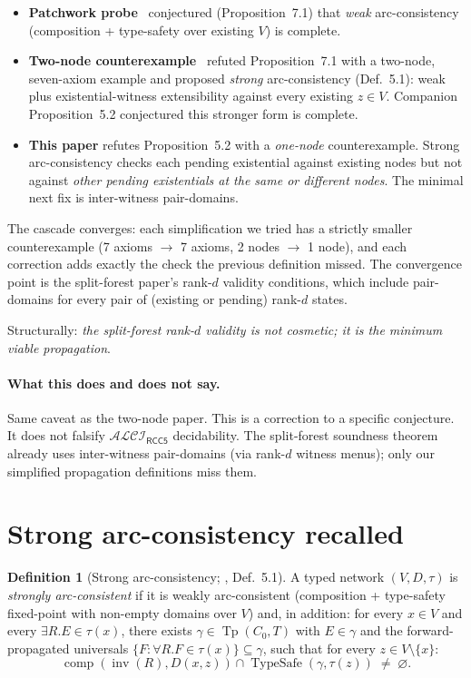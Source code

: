 \documentclass[11pt]{article}
\theoremstyle{definition}
\newtheorem{definition}[theorem]{Definition}
\theoremstyle{remark}
\newcommand{\Tp}{\operatorname{Tp}}
\newcommand{\comp}{\operatorname{comp}}
\newcommand{\inv}{\operatorname{inv}}
\newcommand{\TypeSafe}{\operatorname{TypeSafe}}
\newcommand{\ALCIRCC}[1]{\mathcal{ALCI}_{\mathsf{RCC#1}}}
\begin{document}
\begin{itemize}
  \item \textbf{Patchwork probe}~\cite{PatchworkProbe} conjectured
    (Proposition~7.1) that \emph{weak} arc-consistency
    (composition + type-safety over existing $V$) is complete.
  \item \textbf{Two-node counterexample}~\cite{CounterEx2} refuted
    Proposition~7.1 with a two-node, seven-axiom example and
    proposed \emph{strong} arc-consistency (Def.~5.1): weak plus
    existential-witness extensibility against every existing $z \in
    V$.  Companion Proposition~5.2 conjectured this stronger form is
    complete.
  \item \textbf{This paper} refutes Proposition~5.2 with a
    \emph{one-node} counterexample.  Strong arc-consistency checks
    each pending existential against existing nodes but not against
    \emph{other pending existentials at the same or different nodes}.
    The minimal next fix is inter-witness pair-domains.
\end{itemize}

The cascade converges: each simplification we tried has a strictly
smaller counterexample (7 axioms $\to$ 7 axioms, 2 nodes $\to$ 1
node), and each correction adds exactly the check the previous
definition missed.  The convergence point is the split-forest paper's
rank-$d$ validity conditions, which include pair-domains for every
pair of (existing or pending) rank-$d$ states.

Structurally: \emph{the split-forest rank-$d$ validity is not
cosmetic; it is the minimum viable propagation}.

\paragraph{What this does and does not say.}
Same caveat as the two-node paper.  This is a correction to a
specific conjecture.  It does not falsify $\ALCIRCC{5}$
decidability.  The split-forest soundness
theorem~\cite{SplitForest} already uses inter-witness pair-domains
(via rank-$d$ witness menus); only our simplified propagation
definitions miss them.

\section{Strong arc-consistency recalled}
\label{sec:strong}

\begin{definition}[Strong arc-consistency; \cite{CounterEx2}, Def.~5.1]
\label{def:strong}
A typed network $(V, D, \tau)$ is \emph{strongly arc-consistent}
if it is weakly arc-consistent (composition + type-safety
fixed-point with non-empty domains over $V$) and, in addition:
for every $x \in V$ and every $\exists R. E \in \tau(x)$, there
exists $\gamma \in \Tp(C_0, T)$ with $E \in \gamma$ and the
forward-propagated universals $\{F : \forall R. F \in \tau(x)\}
\subseteq \gamma$, such that for every $z \in V \setminus \{x\}$:
\[
  \comp(\inv(R), D(x, z)) \cap \TypeSafe(\gamma, \tau(z))
  \;\neq\; \varnothing.
\]
\end{definition}
\end{document}

